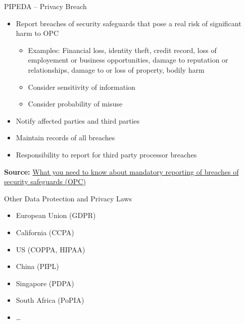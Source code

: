 \documentclass[ignorenonframetext,xcolor=x11names]{beamer}
\begin{document}
   
\begin{frame}{PIPEDA -- Privacy Breach}
\begin{itemize}
   \item Report breaches of security safeguards that pose a real risk of significant harm to OPC
   \begin{itemize}
      \item Examples: Financial loss, identity theft, credit record, loss of employement or business opportunities, damage to reputation or relationships, damage to or loss of property, bodily harm
      \item Consider sensitivity of information
      \item Consider probability of misuse
   \end{itemize}
   \item Notify affected parties and third parties
   \item Maintain records of all breaches
   \item Responsibility to report for third party processor breaches
\end{itemize}

\vspace{\baselineskip}
\scriptsize \textbf{Source:} \href{https://www.priv.gc.ca/en/privacy-topics/business-privacy/safeguards-and-breaches/privacy-breaches/respond-to-a-privacy-breach-at-your-business/gd_pb_201810/}{What you need to know about mandatory reporting of breaches of security safeguards (OPC)}
\end{frame}

\begin{frame}{Other Data Protection and Privacy Laws}
\begin{itemize}
   \item European Union (GDPR)
   \item California (CCPA)
   \item US (COPPA, HIPAA)
   \item China (PIPL)
   \item Singapore (PDPA)
   \item South Africa (PoPIA)
   \item \ldots
\end{itemize}
\end{frame}
\end{document}
